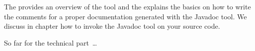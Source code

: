 The  \autocite{ORACLE_DOC_JAVADOC_GUIDE} provides an overview of the tool and the  \autocite{ORACLE_DOC_JAVADOC_TAG} explains the basics on how to write the comments for a proper documentation generated with the Javadoc tool. We discuss in chapter  how to invoke the Javadoc tool on your source code.

So far for the technical part~…

